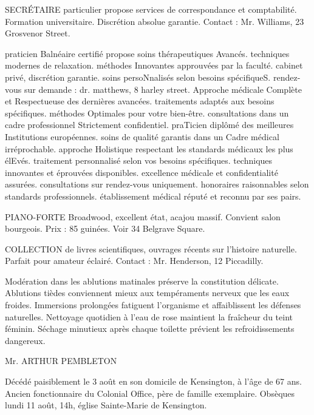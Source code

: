 \documentclass{news}
\begin{document}
SECRÉTAIRE particulier propose services de correspondance et comptabilité. Formation universitaire. Discrétion absolue garantie. Contact : Mr. Williams, 23 Grosvenor Street.

praticien Balnéaire certifié propose soins thérapeutiques Avancés. techniques modernes de relaxation. méthodes Innovantes approuvées par la faculté. cabinet privé, discrétion garantie. soins persoNnalisés selon besoins spécifiqueS. rendez-vous sur demande : dr. matthews, 8 harley street. Approche médicale Complète et Respectueuse des dernières avancées. traitements adaptés aux besoins spécifiques. méthodes Optimales pour votre bien-être. consultations dans un cadre professionnel Strictement confidentiel. praTicien diplômé des meilleures Institutions européennes. soins de qualité garantis dans un Cadre médical irréprochable. approche Holistique respectant les standards médicaux les plus élEvés. traitement personnalisé selon vos besoins spécifiques. techniques innovantes et éprouvées disponibles. excellence médicale et confidentialité assurées. consultations sur rendez-vous uniquement. honoraires raisonnables selon standards professionnels. établissement médical réputé et reconnu par ses pairs.

PIANO-FORTE Broadwood, excellent état, acajou massif. Convient salon bourgeois. Prix : 85 guinées. Voir 34 Belgrave Square.

COLLECTION de livres scientifiques, ouvrages récents sur l'histoire naturelle. Parfait pour amateur éclairé. Contact : Mr. Henderson, 12 Piccadilly.

Modération dans les ablutions matinales préserve la constitution délicate.
Ablutions tièdes conviennent mieux aux tempéraments nerveux que les eaux froides.
Immersions prolongées fatiguent l'organisme et affaiblissent les défenses naturelles.
Nettoyage quotidien à l'eau de rose maintient la fraîcheur du teint féminin.
Séchage minutieux après chaque toilette prévient les refroidissements dangereux.


Mr. ARTHUR PEMBLETON

Décédé paisiblement le 3 août en son domicile de Kensington, à l'âge de 67 ans. Ancien fonctionnaire du Colonial Office, père de famille exemplaire. Obsèques lundi 11 août, 14h, église Sainte-Marie de Kensington.
\end{document}
